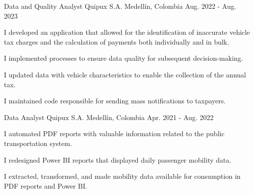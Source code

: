 


\begin{cventries}


\cventry
{Data and Quality Analyst} %
{Quipux S.A.} %
{Medellín, Colombia} %
{Aug. 2022 - Aug. 2023} %
{ %
\begin{cvitems}
\item {I developed an application that allowed for the identification of inaccurate vehicle tax charges and the calculation of payments both individually and in bulk.}
\item {I implemented processes to ensure data quality for subsequent decision-making.}
\item {I updated data with vehicle characteristics to enable the collection of the annual tax.}
\item {I maintained code responsible for sending mass notifications to taxpayers.\hfill \break}
\end{cvitems}
}


\cventry
{Data Analyst} %
{Quipux S.A.} %
{Medellín, Colombia   } %
{Apr. 2021 - Aug. 2022} %
{ %
\begin{cvitems}
\item {I automated PDF reports with valuable information related to the public transportation system.}
\item {I redesigned Power BI reports that displayed daily passenger mobility data.}
\item {I extracted, transformed, and made mobility data available for consumption in PDF reports and Power BI.}
\end{cvitems}
}



\end{cventries}
